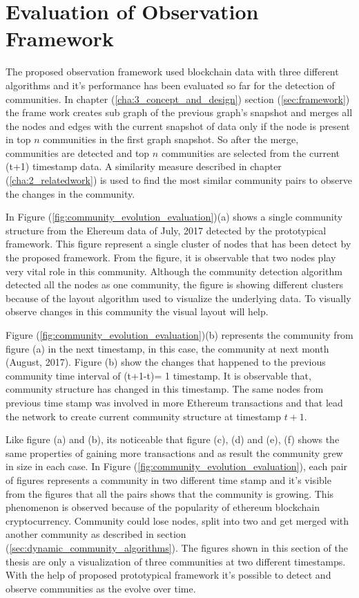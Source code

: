 \section{Evaluation of Observation Framework}
The proposed observation framework used blockchain data with three different algorithms and it's performance has been evaluated so far for the detection of communities. In chapter (\ref{cha:3_concept_and_design}) section (\ref{sec:framework}) the frame work creates sub graph of the previous graph's snapshot and merges all the nodes and edges with the current snapshot of data only if the node is present in top $n$ communities in the first graph snapshot. So after the merge, communities are detected and top $n$ communities are selected from the current (t+1) timestamp data. A similarity measure described in chapter (\ref{cha:2_relatedwork}) is used to find the most similar community pairs to observe the changes in the community.

In Figure (\ref{fig:community_evolution_evaluation})(a) shows a single community structure from the Ehereum data of July, 2017 detected by the prototypical framework. This figure represent a single cluster of nodes that has been detect by the proposed framework. From the figure, it is observable that two nodes play very vital role in this community. Although the community detection algorithm detected all the nodes as one community, the figure is showing different clusters because of the layout algorithm used to visualize the underlying data. To visually observe changes in this community the visual layout will help.

Figure (\ref{fig:community_evolution_evaluation})(b) represents the community  from figure (a) in the next timestamp, in this case, the community at next month (August, 2017). Figure (b) show the changes that happened to the previous community time interval of (t+1-t)= 1 timestamp. It is observable that, community structure has changed in this timestamp. The same nodes from previous time stamp was involved in more Ethereum transactions and that lead the network to create current community structure at timestamp $t+1$.

Like figure (a) and (b), its noticeable that figure (c), (d) and (e), (f) shows the same properties of gaining more transactions and as result the community grew in size in each case. In Figure (\ref{fig:community_evolution_evaluation}), each pair of figures represents a community in two different time stamp and it's visible from the figures that all the pairs shows that the community is growing. This phenomenon is observed because of the popularity of ethereum blockchain cryptocurrency. Community could lose nodes, split into two and get merged with another community as described in section (\ref{sec:dynamic_community_algorithms}). The figures shown in this section of the thesis are only a visualization of three communities at two different timestamps. With the help of proposed prototypical framework it's possible to detect and observe communities as the evolve over time.


